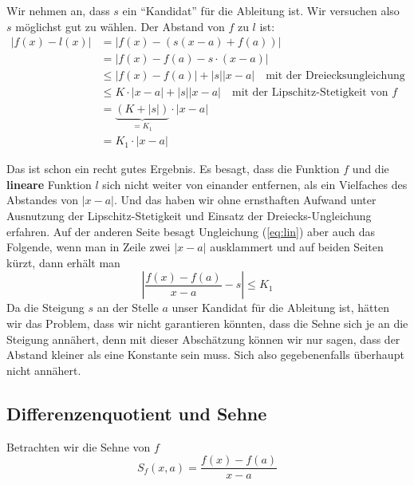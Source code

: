 Wir nehmen an, dass $s$ ein "`Kandidat"' für die Ableitung ist. Wir versuchen also $s$ möglichst gut zu wählen. 
Der Abstand von $f$ zu $l$ ist:
\begin{equation}\label{eq:lin}
\begin{split}
|f(x)-l(x)| &= |f(x)-(s(x-a)+f(a))| \\
&= |f(x)-f(a) -s\cdot (x-a)| \\
&\le |f(x)-f(a)| + |s||x-a| \quad \text{mit der Dreiecksungleichung} \\
&\le K\cdot |x-a| + |s||x-a| \quad \text{mit der Lipschitz-Stetigkeit von }f \\
&= \underbrace{(K+|s|)}_{=K_1}\cdot |x-a| \\
&= K_1\cdot |x-a|
\end{split}
\end{equation}

Das ist schon ein recht gutes Ergebnis. Es besagt, dass die Funktion $f$ und die \textbf{lineare} Funktion $l$ sich nicht weiter von einander entfernen, als ein Vielfaches des Abstandes von $|x-a|$. Und das haben wir ohne ernsthaften Aufwand unter Ausnutzung der Lipschitz-Stetigkeit und Einsatz der Dreiecks-Ungleichung erfahren. Auf der anderen Seite besagt Ungleichung (\ref{eq:lin}) aber auch das Folgende, wenn man in Zeile zwei $|x-a|$ ausklammert und auf beiden Seiten kürzt, dann erhält man
\begin{equation}\label{eq:const}
\left| \frac{f(x)-f(a)}{x-a} -s \right| \le K_1
\end{equation}
Da die Steigung $s$ an der Stelle $a$ unser Kandidat für die Ableitung ist, hätten wir das Problem, dass wir nicht garantieren könnten, dass die Sehne sich je an die Steigung annähert, denn mit dieser Abschätzung können wir nur sagen, dass der Abstand kleiner als eine Konstante sein muss. Sich also gegebenenfalls überhaupt nicht annähert.

\subsection{Differenzenquotient und Sehne}

Betrachten wir die Sehne von $f$
\begin{equation*}
S_f(x,a) = \frac{f(x)-f(a)}{x-a}
\end{equation*}


